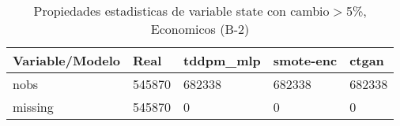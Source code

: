 \begin{table}[H]
\centering
\fontsize{8}{14}\selectfont
\caption{Propiedades estadisticas de variable state con cambio\ensuremath{>}5\%, Economicos (B-2)}
\label{table-stats-economicos-b-2-state-short}
\begin{tabular}{|l|m{10em}|m{10em}|m{10em}|m{10em}|}
\hline
 \rowcolor[gray]{0.8}
Variable/Modelo & Real & tddpm\_mlp & smote-enc & ctgan \\
\hline nobs & 545870 & 682338 & 682338 & 682338 \\
\hline missing & 545870 & 0 & 0 & 0 \\
\hline
\end{tabular}
\end{table}
